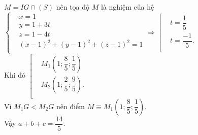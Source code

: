 \begin{ex}
{	$M=IG\cap (S)$ nên tọa độ $M$ là nghiệm của hệ$\left\{ \begin{aligned}
		& x=1 \\
		& y=1+3t \\
		& z=1-4t \\
		& (x-1)^2+(y-1)^2+(z-1)^2=1 \\
	\end{aligned} \right.\Rightarrow \left[ \begin{aligned}
		& t=\dfrac{1}{5} \\
		& t=\dfrac{-1}{5}. \\
	\end{aligned} \right.$ \\
	Khi đó $\left[ \begin{aligned}
		& {M_1}\left( 1;\dfrac{8}{5};\dfrac{1}{5} \right) \\
		& {M_2}\left( 1;\dfrac{2}{5};\dfrac{9}{5} \right). \\
	\end{aligned} \right.$\\
	Vì $M_1G<M_2G$ nên điểm $M\equiv {M_1}\left( 1;\dfrac{8}{5};\dfrac{1}{5} \right)$.\\
	Vậy $a+b+c=\dfrac{14}{5}$.}
\end{ex}
